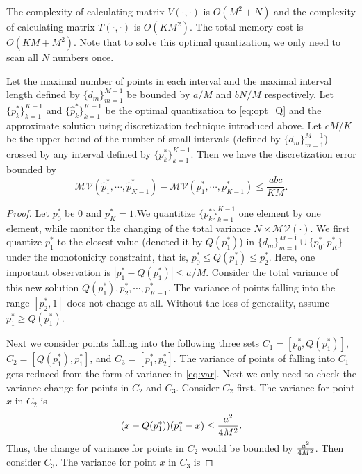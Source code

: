 The complexity of calculating matrix $V(\cdot, \cdot)$ is $O(M^2 + N)$ and the complexity of calculating matrix $T(\cdot, \cdot)$ is $O(KM^2)$. The total memory cost is $O(KM + M^2)$. Note that to solve this optimal quantization, we only need to scan all $N$ numbers once.

\begin{theorem}
Let the maximal number of points in each interval and the maximal interval length defined by $\{d_m\}_{m=1}^{M-1}$ be bounded by $a/M$ and $bN/M$ respectively. Let $\{p^*_k\}_{k=1}^{K-1}$ and $\{\hat{p}^*_k\}_{k=1}^{K-1}$ be the optimal quantization to \eqref{eq:opt_Q} and the approximate solution using discretization technique introduced above. Let $cM/K$ be the upper bound of the number of small intervals (defined by $\{d_m\}_{m=1}^{M-1}$) crossed by any interval defined by $\{p^*_k\}_{k=1}^{K-1}$. Then we have the discretization error bounded by
\[
 \mathcal{MV}(\hat{p}^*_1,\cdots, \hat{p}^*_{K-1}) -  \mathcal{MV}(p^*_1,\cdots, p^*_{K-1}) \leq \frac{abc}{KM}.
\]
\end{theorem}

\begin{proof}
Let $p^*_0$ be $0$ and $p^*_K=1$.We quantitize $\{p^*_k\}_{k=1}^{K-1}$ one element by one element, while monitor the changing of the total variance $N \times \mathcal{MV(\cdot)}$. We first quantize $p^*_1$ to the closest value (denoted it by $Q(p^*_1)$) in $\{d_m\}_{m=1}^{M-1} \cup \{p^*_0,p^*_K\}$ under the monotonicity constraint, that is, $p^*_0\leq Q(p^*_1) \leq p^*_2$. Here, one important observation is $|p^*_{1} - Q(p^*_1)|\leq a/M$. Consider the total variance of this new solution $Q(p^*_1), p^*_2, \cdots, p^*_{K-1}$. The variance of points falling into the range $[p^*_2, 1]$ does not change at all. Without the loss of generality, assume $p^*_{1} \geq Q(p^*_1)$.

Next we consider points falling into the following three sets $C_1 = [p^*_0, Q(p^*_1)]$, $C_2 = [Q(p^*_1), p^*_1]$, and $C_3 = [p^*_1, p^*_2]$. The variance of points of falling into $C_1$ gets reduced from the form of variance in \eqref{eq:var}. Next we only need to check the variance change for points in $C_2$ and $C_3$. Consider $C_2$ first. The variance for point $x$ in $C_2$ is
\[
(x-Q(p^*_1))(p^*_1 - x) \leq {a^2 \over 4 M^2}. 
\]  
Thus, the change of variance for points in $C_2$ would be bounded by ${a^2 \over 4 M^2}$. Then consider $C_3$. The variance for point $x$ in $C_3$ is 
\end{proof}

















